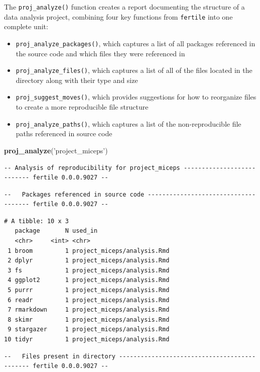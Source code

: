 \documentclass[12pt,twoside]{reedthesis}
\newenvironment{Shaded}{\begin{snugshade}}{\end{snugshade}}
\newcommand{\KeywordTok}[1]{\textcolor[rgb]{0.13,0.29,0.53}{\textbf{#1}}}
\newcommand{\StringTok}[1]{\textcolor[rgb]{0.31,0.60,0.02}{#1}}
\newcommand{\NormalTok}[1]{#1}
\providecommand{\tightlist}{%
  \setlength{\itemsep}{0pt}\setlength{\parskip}{0pt}}
\begin{document}
The \texttt{proj\_analyze()} function creates a report documenting the
structure of a data analysis project, combining four key functions from
\texttt{fertile} into one complete unit:
\begin{itemize}
\tightlist
\item
  \texttt{proj\_analyze\_packages()}, which captures a list of all
  packages referenced in the source code and which files they were
  referenced in
\item
  \texttt{proj\_analyze\_files()}, which captures a list of all of the
  files located in the directory along with their type and size
\item
  \texttt{proj\_suggest\_moves()}, which provides suggestions for how to
  reorganize files to create a more reproducible file structure
\item
  \texttt{proj\_analyze\_paths()}, which captures a list of the
  non-reproducible file paths referenced in source code
\end{itemize}
\footnotesize
\begin{Shaded}
\begin{Highlighting}[]
\KeywordTok{proj_analyze}\NormalTok{(}\StringTok{'project_miceps'}\NormalTok{)}
\end{Highlighting}
\end{Shaded}
\begin{verbatim}
-- Analysis of reproducibility for project_miceps --------------------------- fertile 0.0.0.9027 --
\end{verbatim}
\begin{verbatim}
--   Packages referenced in source code ------------------------------------- fertile 0.0.0.9027 --
\end{verbatim}
\begin{verbatim}
# A tibble: 10 x 3
   package       N used_in                    
   <chr>     <int> <chr>                      
 1 broom         1 project_miceps/analysis.Rmd
 2 dplyr         1 project_miceps/analysis.Rmd
 3 fs            1 project_miceps/analysis.Rmd
 4 ggplot2       1 project_miceps/analysis.Rmd
 5 purrr         1 project_miceps/analysis.Rmd
 6 readr         1 project_miceps/analysis.Rmd
 7 rmarkdown     1 project_miceps/analysis.Rmd
 8 skimr         1 project_miceps/analysis.Rmd
 9 stargazer     1 project_miceps/analysis.Rmd
10 tidyr         1 project_miceps/analysis.Rmd
\end{verbatim}
\begin{verbatim}
--   Files present in directory --------------------------------------------- fertile 0.0.0.9027 --
\end{verbatim}
\end{document}
